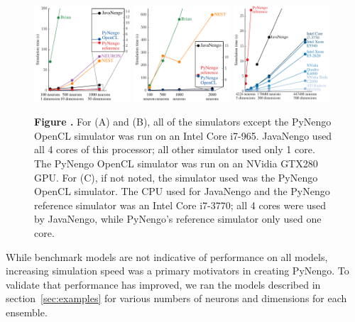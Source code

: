 \documentclass{frontiersSCNS}
\begin{document}
\begin{figure}
\begin{center}
  \includegraphics[width=0.32\textwidth]{bench_cchannel}
  \includegraphics[width=0.32\textwidth]{bench_lorenz}
  \includegraphics[width=0.32\textwidth]{bench_cconv}
\end{center}
 \textbf{
     \label{fig:benchmarks}
     Figure .}{
     For (A) and (B), all of the simulators
     except the PyNengo OpenCL simulator
     was run on an Intel Core i7-965.
     JavaNengo used all 4 cores of this processor;
     all other simulator used only 1 core.
     The PyNengo OpenCL simulator
     was run on an NVidia GTX280 GPU.
     For (C), if not noted, the simulator used
     was the PyNengo OpenCL simulator.
     The CPU used for JavaNengo and
     the PyNengo reference simulator
     was an Intel Core i7-3770;
     all 4 cores were used by JavaNengo,
     while PyNengo's reference simulator
     only used one core.
     }
\end{figure}

While benchmark models are not indicative
of performance on all models,
increasing simulation speed
was a primary motivators in creating PyNengo.
To validate that performance has improved,
we ran the models described in section~\ref{sec:examples}
for various numbers of neurons and dimensions
for each ensemble.
\end{document}
